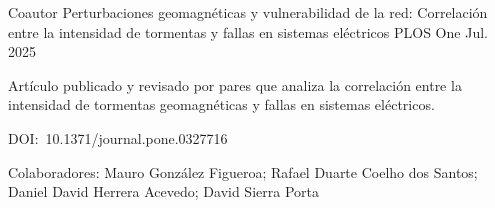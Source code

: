 

\begin{cventries}
  \cventry
    {Coautor}
    {Perturbaciones geomagnéticas y vulnerabilidad de la red: Correlación entre la intensidad de tormentas y fallas en sistemas eléctricos}
    {PLOS One}
    {Jul. 2025}
    {
      \begin{cvitems}
        \item {Artículo publicado y revisado por pares que analiza la correlación entre la intensidad de tormentas geomagnéticas y fallas en sistemas eléctricos.}
        \item {DOI:~10.1371/journal.pone.0327716}
        \item {Colaboradores: Mauro González Figueroa; Rafael Duarte Coelho dos Santos; Daniel David Herrera Acevedo; David Sierra Porta}
      \end{cvitems}
    }
\end{cventries}